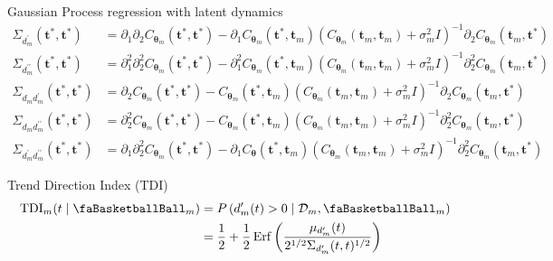 \documentclass[ignorenonframetext,xcolor=pdflatex,table,dvipsnames,serif]{beamer}
\newcommand{\BTheta}{\text{\faBasketballBall}}
\DeclareMathOperator{\Erf}{Erf}
\begin{document}
\begin{frame}{Gaussian Process regression with latent dynamics}
{\begin{align*}
  \Sigma_{d_m^\prime}(\mathbf{t}^\ast, \mathbf{t}^\ast) &= \partial_1\partial_2C_{\bm{\theta}_m}(\mathbf{t}^\ast, \mathbf{t}^\ast) - \partial_1C_{\bm{\theta}_m}(\mathbf{t}^\ast, \mathbf{t}_m)\left(C_{\bm{\theta}_m}(\mathbf{t}_m, \mathbf{t}_m) + \sigma^2_m I\right)^{-1} \partial_2C_{\bm{\theta}_m}(\mathbf{t}_m, \mathbf{t}^\ast)\\
  \Sigma_{d_m^{\prime\prime}}(\mathbf{t}^\ast, \mathbf{t}^\ast) &= \partial_1^2\partial_2^2 C_{\bm{\theta}_m}(\mathbf{t}^\ast, \mathbf{t}^\ast) - \partial_1^2 C_{\bm{\theta}_m}(\mathbf{t}^\ast, \mathbf{t}_m)\left(C_{\bm{\theta}_m}(\mathbf{t}_m, \mathbf{t}_m) + \sigma^2_m I\right)^{-1} \partial_2^2 C_{\bm{\theta}_m}(\mathbf{t}_m, \mathbf{t}^\ast)\\
  \Sigma_{d_m d_m^\prime}(\mathbf{t}^\ast, \mathbf{t}^\ast) &= \partial_2 C_{\bm{\theta}_m}(\mathbf{t}^\ast, \mathbf{t}^\ast) - C_{\bm{\theta}_m}(\mathbf{t}^\ast, \mathbf{t}_m)\left(C_{\bm{\theta}_m}(\mathbf{t}_m, \mathbf{t}_m) + \sigma^2_m I\right)^{-1} \partial_2 C_{\bm{\theta}_m}(\mathbf{t}_m, \mathbf{t}^\ast)\\
  \Sigma_{d_m d_m^{\prime\prime}}(\mathbf{t}^\ast, \mathbf{t}^\ast) &= \partial_2^2 C_{\bm{\theta}_m}(\mathbf{t}^\ast, \mathbf{t}^\ast) - C_{\bm{\theta}_m}(\mathbf{t}^\ast, \mathbf{t}_m)\left(C_{\bm{\theta}_m}(\mathbf{t}_m, \mathbf{t}_m) + \sigma^2_m I\right)^{-1} \partial_2^2 C_{\bm{\theta}_m}(\mathbf{t}_m, \mathbf{t}^\ast)\\
  \Sigma_{d_m^\prime d_m^{\prime\prime}}(\mathbf{t}^\ast, \mathbf{t}^\ast) &= \partial_1 \partial_2^2 C_{\bm{\theta}_m}(\mathbf{t}^\ast, \mathbf{t}^\ast) - \partial_1 C_{\bm{\theta}}(\mathbf{t}^\ast, \mathbf{t}_m)\left(C_{\bm{\theta}_m}(\mathbf{t}_m, \mathbf{t}_m) + \sigma^2_m I\right)^{-1} \partial_2^2 C_{\bm{\theta}_m}(\mathbf{t}_m, \mathbf{t}^\ast)
\end{align*}
}
\end{frame}


\begin{frame}{Trend Direction Index (TDI)}
\begin{align*}
\begin{split}
  \textrm{TDI}_m(t \mid \BTheta_m) &= P\left(d_m^\prime(t) > 0 \mid \mathcal{D}_m, \BTheta_m\right)\\
     &= \frac{1}{2} + \frac{1}{2}\Erf\left(\frac{\mu_{d_m^\prime}(t)}{2^{1/2}\Sigma_{d_m^\prime}(t, t)^{1/2}}\right)
\end{split}
\end{align*}	
\end{frame}
\end{document}
